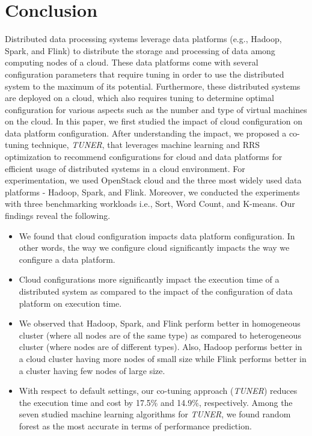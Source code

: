 \documentclass[3p]{elsarticle}
\begin{document}
\section{Conclusion}
Distributed data processing systems leverage data platforms (e.g., Hadoop, Spark, and Flink) to distribute the storage and processing of data among computing nodes of a cloud. These data platforms come with several configuration parameters that require tuning in order to use the distributed system to the maximum of its potential. Furthermore, these distributed systems are deployed on a cloud, which also requires tuning to determine optimal configuration for various aspects such as the number and type of virtual machines on the cloud. In this paper, we first studied the impact of cloud configuration on data platform configuration. After understanding the impact, we proposed a co-tuning technique, \textit{TUNER}, that leverages machine learning and RRS optimization to recommend configurations for cloud and data platforms for efficient usage of distributed systems in a cloud environment. For experimentation, we used OpenStack cloud and the three most widely used data platforms - Hadoop, Spark, and Flink. Moreover, we conducted the experiments with three benchmarking workloads i.e., Sort, Word Count, and K-means. Our findings reveal the following.
\begin{itemize}

\item We found that cloud configuration impacts data platform configuration. In other words, the way we configure cloud significantly impacts the way we configure a data platform. 
\item Cloud configurations more significantly impact the execution time of a distributed system as compared to the impact of the configuration of data platform on execution time.
\item We observed that Hadoop, Spark, and Flink perform better in homogeneous cluster (where all nodes are of the same type) as compared to heterogeneous cluster (where nodes are of different types). Also, Hadoop performs better in a cloud cluster having more nodes of small size while Flink performs better in a cluster having few nodes of large size. 
\item With respect to default settings,  our co-tuning approach (\textit{TUNER}) reduces the execution time and cost by 17.5\% and 14.9\%, respectively. Among the seven studied machine learning algorithms for \textit{TUNER}, we found random forest as the most accurate in terms of performance prediction.

\end{itemize}
\end{document}
